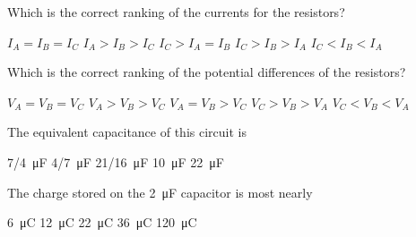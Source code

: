 \documentclass{../../../oss-classkick-exam}
\begin{document}
\begin{multicols*}{2}
\begin{questions}
    \question Which is the correct ranking of the currents for the resistors?
    \label{3resistors1}
    \begin{choices}
      \choice $I_A = I_B = I_C$
      \choice $I_A > I_B > I_C$
      \choice $I_C > I_A = I_B$
      \choice $I_C > I_B > I_A$
      \choice $I_C < I_B < I_A$
    \end{choices}

    \question Which is the correct ranking of the potential differences of the
    resistors?
    \label{3resistors2}
    \begin{choices}
      \choice $V_A = V_B = V_C$
      \choice $V_A > V_B > V_C$
      \choice $V_A = V_B > V_C$
      \choice $V_C > V_B > V_A$
      \choice $V_C < V_B < V_A$
    \end{choices}

  
    \question The equivalent capacitance of this circuit is
    \begin{choices}
      \choice\SI{7/4}{\micro\farad}
      \choice\SI{4/7}{\micro\farad}
      \choice\SI{21/16}{\micro\farad}
      \choice\SI{10}{\micro\farad}
      \choice\SI{22}{\micro\farad}
    \end{choices}
    \label{cap1}
    
    \question The charge stored on the \SI{2}{\micro\farad} capacitor is most
    nearly
    \begin{choices}
      \choice \SI{6}{\micro\coulomb}
      \choice \SI{12}{\micro\coulomb}
      \choice \SI{22}{\micro\coulomb}
      \choice \SI{36}{\micro\coulomb}
      \choice \SI{120}{\micro\coulomb}
    \end{choices}
    \label{cap2}
    

\end{questions}
\end{multicols*}
\end{document}

